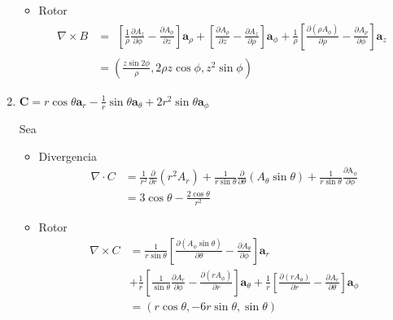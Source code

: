 \begin{problema}
\begin{enumerate}
\begin{sol}
\begin{itemize}
                \item Rotor
                \begin{align*}
                    \nabla\times B &= \begin{aligned}
                         {\left[\frac{1}{\rho} \frac{\partial A_z}{\partial \phi}-\frac{\partial A_\phi}{\partial z}\right] \mathbf{a}_\rho+\left[\frac{\partial A_\rho}{\partial z}-\frac{\partial A_z}{\partial \rho}\right] \mathbf{a}_\phi}
                         +\frac{1}{\rho}\left[\frac{\partial\left(\rho A_\phi\right)}{\partial \rho}-\frac{\partial A_\rho}{\partial \phi}\right] \mathbf{a}_z
                        \end{aligned}\\
                        &= \left(\frac{z\sin 2\phi}{\rho},2\rho z\cos\phi,z^2\sin \phi\right)
                \end{align*}
            \end{itemize}
        \end{sol}
        \item $\mathbf{C}=r \cos \theta \mathbf{a}_{r}-\frac{1}{r} \sin \theta \mathbf{a}_{\theta}+2 r^{2} \sin \theta \mathbf{a}_{\phi}$ 
        \begin{sol}
            Sea 
            \begin{itemize}
                \item Divergencia
                \begin{align*}
                    \nabla\cdot C &= \frac{1}{r^2} \frac{\partial}{\partial r}\left(r^2 A_r\right)+\frac{1}{r \sin \theta} \frac{\partial}{\partial \theta}\left(A_\theta \sin \theta\right)+\frac{1}{r \sin \theta} \frac{\partial \mathrm{A}_\phi}{\partial \phi}\\
                    &= 3\cos\theta-\frac{2\cos\theta}{r^2}
                \end{align*}
                \item Rotor
                \begin{align*}
                     \nabla\times C &=
                         \frac{1}{r \sin \theta}\left[\frac{\partial\left(A_\phi \sin \theta\right)}{\partial \theta}-\frac{\partial A_\theta}{\partial \phi}\right] \mathbf{a}_r \\
                        & +\frac{1}{r}\left[\frac{1}{\sin \theta} \frac{\partial A_r}{\partial \phi}-\frac{\partial\left(r A_\phi\right)}{\partial r}\right] \mathbf{a}_\theta+\frac{1}{r}\left[\frac{\partial\left(r A_\theta\right)}{\partial r}-\frac{\partial A_r}{\partial \theta}\right] \mathbf{a}_\phi\\
                        &=\left(r\cos\theta,-6r\sin \theta,\sin\theta\right)
                \end{align*}
            \end{itemize}
        \end{sol}
    \end{enumerate}
    
\end{problema}

